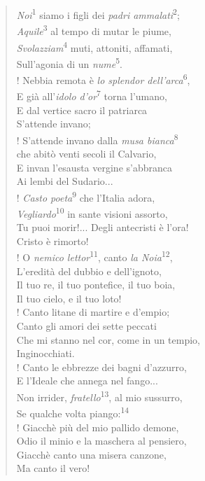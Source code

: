 \documentclass{book}
\newcounter{mar}
\begin{document}
\begin{verse}
\textit{Noi}\textsuperscript{1} siamo i figli dei \textit{padri ammalati}\textsuperscript{2};\\
\textit{Aquile}\textsuperscript{3} al tempo di mutar le piume,\\
\textit{Svolazziam}\textsuperscript{4} muti, attoniti, affamati,\\
Sull’agonia di un \textit{nume}\textsuperscript{5}.\\!
Nebbia remota è \textit{lo splendor dell’arca}\textsuperscript{6},\\
E già all’\textit{idolo d’or}\textsuperscript{7} torna l’umano,\\
E dal vertice sacro il patriarca\\
S’attende invano;\\!
S’attende invano dalla \textit{musa bianca}\textsuperscript{8}\\
che abitò venti secoli il Calvario,\\
E invan l’esausta vergine s’abbranca\\
Ai lembi del Sudario...\\!
\textit{Casto poeta}\textsuperscript{9} che l’Italia adora,\\
\textit{Vegliardo}\textsuperscript{10} in sante visioni assorto,\\
Tu puoi morir!... Degli antecristi è l’ora!\\
Cristo è rimorto!\\!
O \textit{nemico lettor}\textsuperscript{11}, canto \textit{la Noia}\textsuperscript{12},\\
L’eredità del dubbio e dell’ignoto,\\
Il tuo re, il tuo pontefice, il tuo boia,\\
Il tuo cielo, e il tuo loto!\\!
Canto litane di martire e d’empio;\\
Canto gli amori dei sette peccati\\
Che mi stanno nel cor, come in un tempio,\\
Inginocchiati.\\!
Canto le ebbrezze dei bagni d’azzurro,\\
E l’Ideale che annega nel fango...\\
Non irrider, \textit{fratello}\textsuperscript{13}, al mio sussurro,\\
Se qualche volta piango:\textsuperscript{14}\\!
Giacchè più del mio pallido demone,\\
Odio il minio e la maschera al pensiero,\\
Giacchè canto una misera canzone,\\
Ma canto il vero!
\end{verse}
\end{document}
